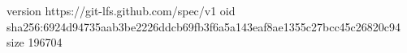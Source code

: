 version https://git-lfs.github.com/spec/v1
oid sha256:6924d94735aab3be2226ddcb69fb3f6a5a143eaf8ae1355c27bcc45c26820c94
size 196704
